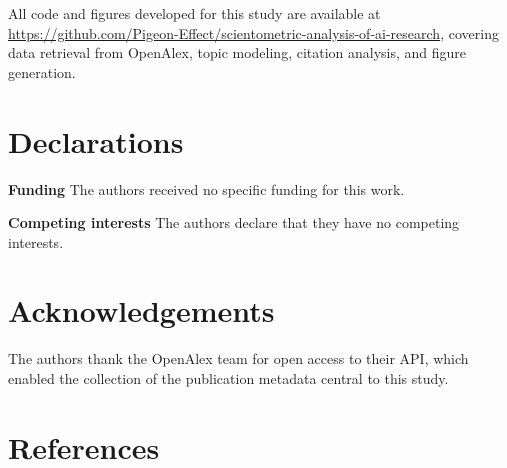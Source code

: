 \documentclass{article}
\begin{document}
	All code and figures developed for this study are available at \url{https://github.com/Pigeon-Effect/scientometric-analysis-of-ai-research}, covering data retrieval from OpenAlex, topic modeling, citation analysis, and figure generation.
	
	\section*{Declarations}
	
	\textbf{Funding} The authors received no specific funding for this work.
	
	\textbf{Competing interests} The authors declare that they have no competing interests.
	
	
	\section*{Acknowledgements}
	
	The authors thank the OpenAlex team for open access to their API, which enabled the collection of the publication metadata central to this study.
	
	\section*{References}
	
	\printbibliography[heading=none]
	
\end{document}
